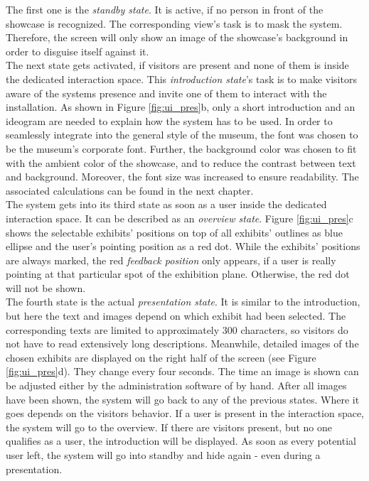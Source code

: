 The first one is the \textit{standby state}. It is active, if no person in front of the showcase is recognized. The corresponding view's task is to mask the system. Therefore, the screen will only show an image of the showcase's background in order to disguise itself against it. 
\\
The next state gets activated, if visitors are present and none of them is inside the dedicated interaction space. This \textit{introduction state}'s task is to make visitors aware of the systems presence and invite one of them to interact with the installation. As shown in Figure \ref{fig:ui_pres}b, only a short introduction and an ideogram are needed to explain how the system has to be used. In order to seamlessly integrate into the general style of the museum, the font was chosen to be the museum's corporate font. Further, the background color was chosen to fit with the ambient color of the showcase, and to reduce the contrast between text and background. Moreover, the font size was increased to ensure readability. The associated calculations can be found in the next chapter. 
\\
The system gets into its third state as soon as a user inside the dedicated interaction space. It can be described as an \textit{overview state}. Figure \ref{fig:ui_pres}c shows the selectable exhibits' positions on top of all exhibits' outlines as blue ellipse and the user's pointing position as a red dot. While the exhibits' positions are always marked, the red \textit{feedback position} only appears, if a user is really pointing at that particular spot of the exhibition plane. Otherwise, the red dot will not be shown.
\\
The fourth state is the actual \textit{presentation state}. It is similar to the introduction, but here the text and images depend on which exhibit had been selected. The corresponding texts are limited to approximately 300 characters, so visitors do not have to read extensively long descriptions. Meanwhile, detailed images of the chosen exhibits are displayed on the right half of the screen (see Figure \ref{fig:ui_pres}d). They change every four seconds. The time an image is shown can be adjusted either by the administration software of by hand. After all images have been shown, the system will go back to any of the previous states. Where it goes depends on the visitors behavior. If a user is present in the interaction space, the system will go to the overview. If there are visitors present, but no one qualifies as a user, the introduction will be displayed. As soon as every potential user left, the system will go into standby and hide again - even during a presentation.

